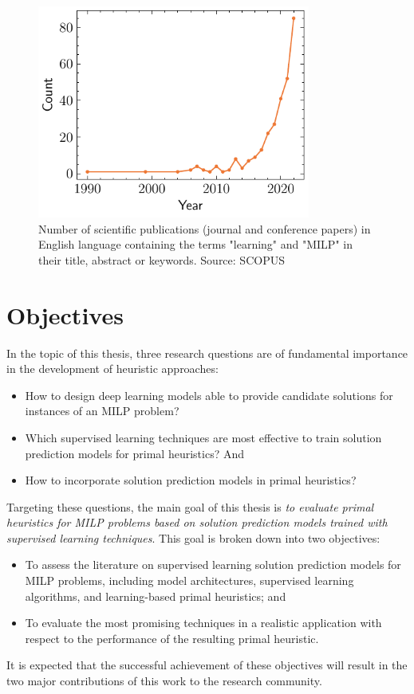 \begin{figure}[h]
    \centering
    \includegraphics[width=0.8\textwidth]{pictures/scopus.pdf}
    \caption{Number of scientific publications (journal and conference papers) in English language containing the terms "learning" and "MILP" in their title, abstract or keywords. Source: SCOPUS}
    \label{fig:scopus-trend}
\end{figure}

\section{Objectives}\label{chap:objectives}

In the topic of this thesis, three research questions are of fundamental importance in the development of heuristic approaches:
\begin{itemize}
    \item How to design deep learning models able to provide candidate solutions for instances of an MILP problem?
    \item Which supervised learning techniques are most effective to train solution prediction models for primal heuristics? And
    \item How to incorporate solution prediction models in primal heuristics?
\end{itemize}
Targeting these questions, the main goal of this thesis is \emph{to evaluate primal heuristics for MILP problems based on solution prediction models trained with supervised learning techniques}.
This goal is broken down into two objectives:
\begin{itemize}
    \item To assess the literature on supervised learning solution prediction models for MILP problems, including model architectures, supervised learning algorithms, and learning-based primal heuristics; and
    \item To evaluate the most promising techniques in a realistic application with respect to the performance of the resulting primal heuristic.
\end{itemize}
It is expected that the successful achievement of these objectives will result in the two major contributions of this work to the research community.

